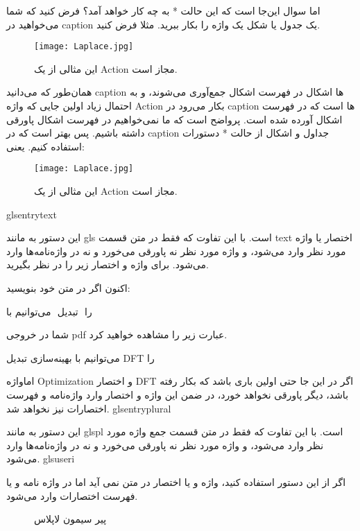 اما سوال این‌جا است که این حالت * به چه کار خواهد آمد؟ فرض کنید که شما می‌خواهید در caption یک جدول یا شکل یک واژه را بکار ببرید. مثلا فرض کنید.

\begin{figure}
\texttt{[image: Laplace.jpg]}
\caption{
این مثالی از یک ‎\gls{Action}	 مجاز است.
}
\label{fig:sample1}
\end{figure}

همان‌طور که می‌دانید caption ها اشکال در فهرست اشکال جمع‌آوری می‌شوند، و به احتمال زیاد اولین جایی که واژه Action بکار می‌رود در caption ها است که در فهرست اشکال آورده شده است. پرواضح است که ما نمی‌خواهیم در فهرست اشکال پاورقی داشته باشیم. پس بهتر است که در caption‌ جداول و اشکال از حالت * دستورات استفاده کنیم. یعنی:

\begin{figure}
\texttt{[image: Laplace.jpg]}
\caption{
این مثالی از یک ‪‎\gls*{Action}‬ مجاز است.
}
\label{fig:sample4}
\end{figure}

glsentrytext

این دستور به مانند gls است. با این تفاوت که فقط در متن قسمت text اختصار یا واژه مورد نظر وارد می‌شود، و واژه مورد نظر نه پاورقی می‌خورد و نه در واژه‌نامه‌ها وارد می‌شود. برای واژه و اختصار زیر را در نظر بگیرید.

 

اکنون اگر در متن خود بنویسید:

می‌توانیم با ‎‎ تبدیل ‎‎ را

شما در خروجی pdf عبارت زیر را مشاهده خواهید کرد.

می‌توانیم با بهینه‌سازی تبدیل DFT را


اماواژه Optimization و اختصار DFT اگر در این جا حتی اولین باری باشد که بکار رفته باشد، دیگر پاورقی نخواهد خورد، در ضمن این واژه و اختصار وارد واژه‌نامه و فهرست اختصارات نیز نخواهد شد.
glsentryplural

این دستور به مانند glspl است. با این تفاوت که فقط در متن قسمت جمع واژه مورد نظر وارد می‌شود، و واژه مورد نظر نه پاورقی می‌خورد و نه در واژه‌نامه‌ها وارد می‌شود.
glsuseri

اگر از این دستور استفاده کنید، واژه و یا اختصار در متن نمی آید اما در واژه نامه و یا فهرست اختصارات وارد می‌شود. 

\begin{figure}[ht]
\centering
{}
\caption{\label{fig:laplace} پیر سیمون لاپلاس}
\end{figure}
%

  
